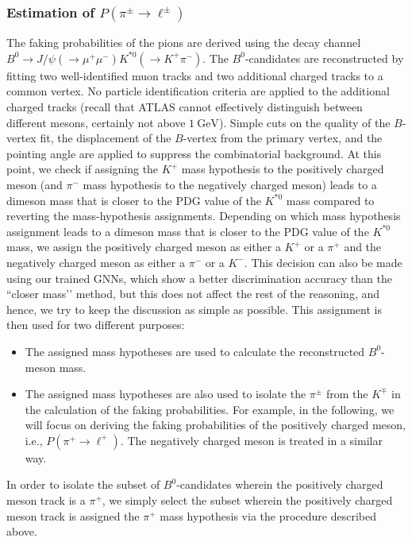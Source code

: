 \subsubsection{Estimation of $P(\pi^\pm \to \ell^\pm)$}
The faking probabilities of the pions are derived using the decay channel $B^0\to J/\psi(\to \mu^+\mu^-)K^{\ast 0}(\to K^+\pi^-)$. %
The $B^0$-candidates are reconstructed by fitting two well-identified muon tracks and two additional charged tracks to a common vertex. %
No particle identification criteria are applied to the additional charged tracks (recall that ATLAS cannot effectively distinguish between different mesons, certainly not above $1{\ {\text{GeV}}}$). %
Simple cuts on the quality of the $B$-vertex fit, the displacement of the $B$-vertex from the primary vertex, and the pointing angle are applied to suppress the combinatorial background. %
At this point, we check if assigning the $K^+$ mass hypothesis to the positively charged meson (and $\pi^-$ mass hypothesis to the negatively charged meson) leads to a dimeson mass that is closer to the PDG value of the $K^{\ast 0}$ mass compared to reverting the mass-hypothesis assignments. %
Depending on which mass hypothesis assignment leads to a dimeson mass that is closer to the PDG value of the $K^{\ast 0}$ mass, we assign the positively charged meson as either a $K^+$ or a $\pi^+$ and the negatively charged meson as either a $\pi^-$ or a $K^-$. %
This decision can also be made using our trained GNNs, which show a better discrimination accuracy than the ``closer mass’’ method, but this does not affect the rest of the reasoning, and hence, we try to keep the discussion as simple as possible. %
This assignment is then used for two different purposes:
\begin{itemize}
    \item The assigned mass hypotheses are used to calculate the reconstructed $B^0$-meson mass. %
    \item The assigned mass hypotheses are also used to isolate the $\pi^\pm$ from the $K^\mp$ in the calculation of the faking probabilities. For example, in the following, we will focus on deriving the faking probabilities of the positively charged meson, i.e., $P(\pi^+ \to \ell^+)$. The negatively charged meson is treated in a similar way. %
\end{itemize}
In order to isolate the subset of $B^0$-candidates wherein the positively charged meson track is a $\pi^+$, we simply select the subset wherein the positively charged meson track is assigned the $\pi^+$ mass hypothesis via the procedure described above. %
